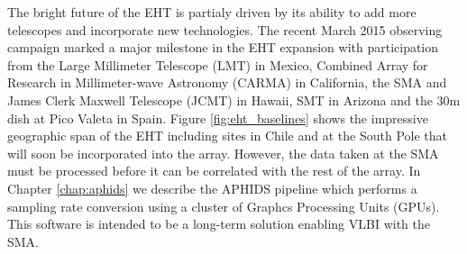 The bright future of the EHT is partialy driven by its ability to add more telescopes and
incorporate new technologies.  The recent March 2015 observing campaign marked a major milestone in
the EHT expansion with participation from the Large Millimeter Telescope (LMT) in Mexico, Combined Array for 
Research in Millimeter-wave Astronomy (CARMA) in California, the SMA and James Clerk Maxwell Telescope (JCMT) in
Hawaii, SMT in Arizona and the 30m dish at Pico Valeta in Spain.  Figure \ref{fig:eht_baselines} shows the
impressive geographic span of the EHT including sites in Chile and at the South Pole that will soon be 
incorporated into the array.  However, the data taken at the SMA must be 
processed before it
can be correlated with the rest of the array.  In Chapter \ref{chap:aphids} we describe the APHIDS pipeline
which performs a sampling rate conversion using a cluster of Graphcs Processing Units (GPUs).  This software
is intended to be a long-term solution enabling VLBI with the SMA.
